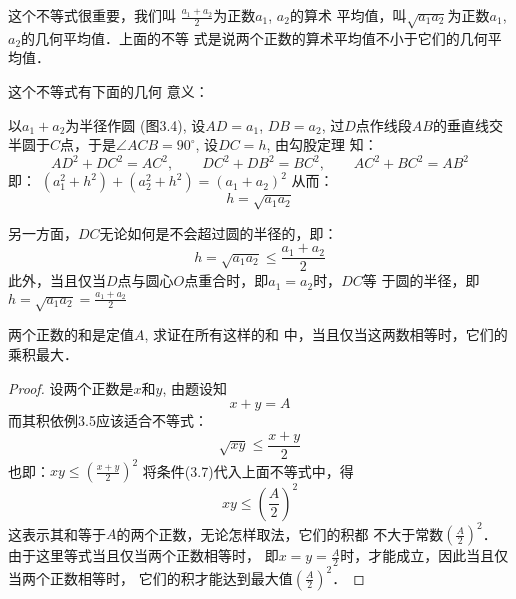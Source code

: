 这个不等式很重要，我们叫
$\frac{a_1+a_2}{2}$为正数$a_1$, $a_2$的算术
平均值，叫$\sqrt{a_1a_2}$为正数$a_1$, $a_2$的几何平均值．上面的不等
式是说两个正数的算术平均值不小于它们的几何平均值．

这个不等式有下面的几何
意义：

\begin{figure}[htp]
    \centering
{} 
    \caption{}
\end{figure}


以$a_1+a_2$为半径作圆
(图3.4), 设$AD=a_1$, $DB=a_2$,
过$D$点作线段$AB$的垂直线交
半圆于$C$点，于是$\angle ACB=
90^{\circ}$, 设$DC=h$, 由勾股定理
知：
\[AD^2+DC^2=AC^2,\qquad DC^2+DB^2=BC^2,\qquad AC^2+BC^2=AB^2\]
即：
$(a_1^2+h^2)+(a_2^2+h^2) =(a_1+a_2)^2$
从而：
\[h=\sqrt{a_1a_2}\]

另一方面，$DC$无论如何是不会超过圆的半径的，即：
\[h=\sqrt{a_1a_2}\le \frac{a_1+a_2}{2}\]
此外，当且仅当$D$点与圆心$O$点重合时，即$a_1=a_2$时，$DC$等
于圆的半径，即$h=\sqrt{a_1a_2}=\frac{a_1+a_2}{2}$    

\begin{example}
    两个正数的和是定值$A$, 求证在所有这样的和
中，当且仅当这两数相等时，它们的乘积最大．
\end{example}

\begin{proof}
设两个正数是$x$和$y$, 由题设知
\begin{equation}
   x+y=A 
\end{equation}
而其积依例3.5应该适合不等式：
\[\sqrt{xy}\le \frac{x+y}{2}\]
也即：$xy\le \left(\frac{x+y}{2}\right)^2$
将条件(3.7)代入上面不等式中，得
\[xy\le \left(\frac{A}{2}\right)^2\]
这表示其和等于$A$的两个正数，无论怎样取法，它们的积都
不大于常数$\left(\frac{A}{2}\right)^2$．
由于这里等式当且仅当两个正数相等时，
即$x=y=\frac{A}{2}$时，才能成立，因此当且仅当两个正数相等时，
它们的积才能达到最大值$\left(\frac{A}{2}\right)^2$．

\end{proof}
    
